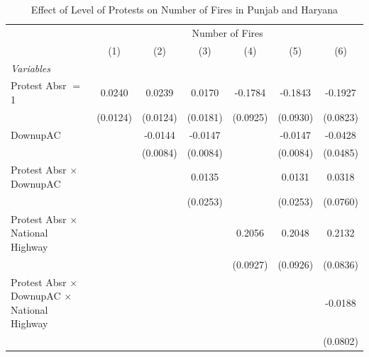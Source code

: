 
\begin{table}[htbp]
   \caption{\label{tab:protest_treat_main} Effect of Level of Protests on Number of Fires in Punjab and Haryana}
   \centering
   \begin{tabular}{lcccccc}
      \tabularnewline \midrule \midrule
       & \multicolumn{6}{c}{Number of Fires}\\
                                                                 & (1)           & (2)           & (3)           & (4)           & (5)           & (6)\\  
      \midrule
      \emph{Variables}\\
      Protest Absr $=$ 1                                         & 0.0240        & 0.0239        & 0.0170        & -0.1784       & -0.1843       & -0.1927\\   
                                                                 & (0.0124)      & (0.0124)      & (0.0181)      & (0.0925)      & (0.0930)      & (0.0823)\\   
      DownupAC                                                   &               & -0.0144       & -0.0147       &               & -0.0147       & -0.0428\\   
                                                                 &               & (0.0084)      & (0.0084)      &               & (0.0084)      & (0.0485)\\   
      Protest Absr $\times$ DownupAC                             &               &               & 0.0135        &               & 0.0131        & 0.0318\\   
                                                                 &               &               & (0.0253)      &               & (0.0253)      & (0.0760)\\   
      Protest Absr $\times$ National Highway                     &               &               &               & 0.2056        & 0.2048        & 0.2132\\   
                                                                 &               &               &               & (0.0927)      & (0.0926)      & (0.0836)\\   
      Protest Absr $\times$ DownupAC $\times$ National Highway   &               &               &               &               &               & -0.0188\\   
                                                                 &               &               &               &               &               & (0.0802)\\   

\end{tabular}
\end{table}

